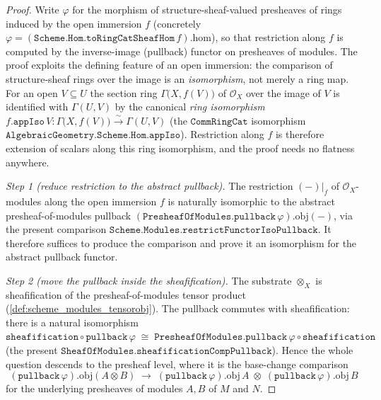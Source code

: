 \begin{proof}
  \leanok
  Write \(\varphi\) for the morphism of structure-sheaf-valued presheaves of
  rings induced by the open immersion \(f\) (concretely
  \(\varphi = (\mathtt{Scheme.Hom.toRingCatSheafHom}\,f).\mathrm{hom}\)), so that
  restriction along \(f\) is computed by the inverse-image (pullback) functor on
  presheaves of modules. The proof exploits the defining feature of an open
  immersion: the comparison of structure-sheaf rings over the image is an
  \emph{isomorphism}, not merely a ring map. For an open \(V \subseteq U\) the
  section ring \(\Gamma\bigl(X, f(V)\bigr)\) of \(\mathcal{O}_X\) over the image
  of \(V\) is identified with \(\Gamma(U, V)\) by the canonical \emph{ring
  isomorphism}
  \(f.\mathtt{appIso}\,V : \Gamma\bigl(X, f(V)\bigr) \xrightarrow{\sim}
  \Gamma(U, V)\)
  (the \(\mathtt{CommRingCat}\) isomorphism
  \(\mathtt{AlgebraicGeometry.Scheme.Hom.appIso}\)). Restriction along \(f\) is
  therefore extension of scalars along
  this ring isomorphism, and the proof needs no flatness anywhere.

  \emph{Step 1 (reduce restriction to the abstract pullback).} The restriction
  \((-)|_f\) of \(\mathcal{O}_X\)-modules along the open immersion \(f\) is
  naturally isomorphic to the abstract presheaf-of-modules pullback
  \((\mathtt{PresheafOfModules.pullback}\,\varphi).\mathrm{obj}(-)\), via the
  present comparison \(\mathtt{Scheme.Modules.restrictFunctorIsoPullback}\). It
  therefore suffices to produce the comparison and prove it an isomorphism for
  the abstract pullback functor.

  \emph{Step 2 (move the pullback inside the sheafification).} The substrate
  \(\otimes_X\) is sheafification of the presheaf-of-modules tensor product
  (\cref{def:scheme_modules_tensorobj}). The pullback commutes with
  sheafification: there is a natural isomorphism
  \(\mathtt{sheafification} \circ \mathtt{pullback}\,\varphi
   \;\cong\;
   \mathtt{PresheafOfModules.pullback}\,\varphi \circ \mathtt{sheafification}\)
  (the present \(\mathtt{SheafOfModules.sheafificationCompPullback}\)). Hence the
  whole question descends to the presheaf level, where it is the base-change
  comparison
  \[
    (\mathtt{pullback}\,\varphi).\mathrm{obj}(A \otimes B)
      \;\longrightarrow\;
    (\mathtt{pullback}\,\varphi).\mathrm{obj}\,A
      \;\otimes\;
    (\mathtt{pullback}\,\varphi).\mathrm{obj}\,B
  \]
  for the underlying presheaves of modules \(A, B\) of \(M\) and \(N\).


\end{proof}
